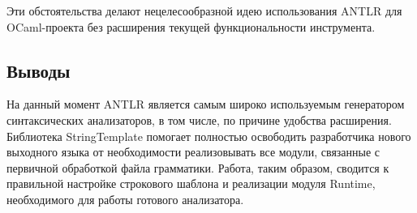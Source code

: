Эти обстоятельства делают нецелесообразной идею использования ANTLR для OCaml-проекта без расширения текущей функциональности инструмента.

\subsection{Выводы}

На данный момент ANTLR является самым широко используемым генератором синтаксических анализаторов, в том числе, по причине удобства 
расширения. 
Библиотека StringTemplate помогает полностью освободить разработчика нового выходного языка от необходимости реализовывать все модули, 
связанные с первичной обработкой файла грамматики. 
Работа, таким образом, сводится к правильной настройке строкового шаблона и реализации модуля Runtime, необходимого для работы готового 
анализатора.